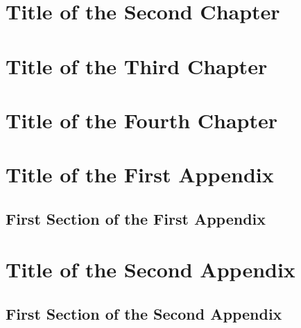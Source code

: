 \documentclass[a4paper,12pt,twoside]{report}
\begin{document}
\chapter{Title of the Second Chapter}
\thispagestyle{empty}

\chapter{Title of the Third Chapter}
\thispagestyle{empty}

\chapter{Title of the Fourth Chapter}
\thispagestyle{empty}

\printglossary[title=Glossary]




\appendix
\appendixpage
\addappheadtotoc
\chapter{Title of the First Appendix}
\section{First Section of the First Appendix}

\chapter{Title of the Second Appendix}
\section{First Section of the Second Appendix}

\printindex
\end{document}
